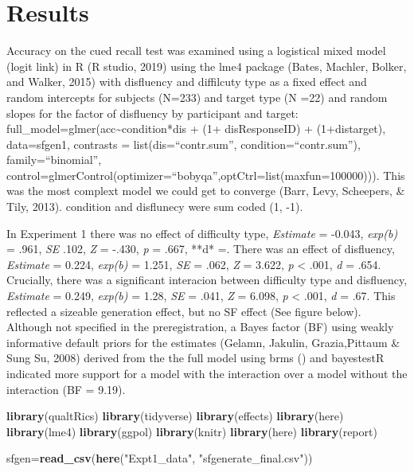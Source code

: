 \documentclass[pdf]{apa6}
\newenvironment{Shaded}{\begin{snugshade}}{\end{snugshade}}
\newcommand{\KeywordTok}[1]{\textcolor[rgb]{0.13,0.29,0.53}{\textbf{#1}}}
\newcommand{\NormalTok}[1]{#1}
\newcommand{\StringTok}[1]{\textcolor[rgb]{0.31,0.60,0.02}{#1}}
\begin{document}
\hypertarget{results-1}{%
\section{Results}\label{results-1}}

Accuracy on the cued recall test was examined using a logistical mixed model (logit link) in R (R studio, 2019) using the lme4 package (Bates, Machler, Bolker, and Walker, 2015) with disfluency and diffilcuty type as a fixed effect and random intercepts for subjects (N=233) and target type (N =22) and random slopes for the factor of disfluency by participant and target: full\_model=glmer(acc\textasciitilde{}condition*dis + (1+ dis\textbar{}ResponseID) + (1+dis\textbar{}target), data=sfgen1, contrasts = list(dis=\enquote{contr.sum}, condition=\enquote{contr.sum}), family=\enquote{binomial}, control=glmerControl(optimizer=\enquote{bobyqa},optCtrl=list(maxfun=100000))). This was the most complext model we could get to converge (Barr, Levy, Scheepers, \& Tily, 2013). condition and disflunecy were sum coded (1, -1).

In Experiment 1 there was no effect of difficulty type, \emph{Estimate} = -0.043, \emph{exp(b)} = .961, \emph{SE} .102, \emph{Z} = -.430, \emph{p} = .667, **d* =. There was an effect of disfluency, \emph{Estimate} = 0.224, \emph{exp(b)} = 1.251, \emph{SE} = .062, \emph{Z} = 3.622, \emph{p} \textless{} .001, \emph{d} = .654. Crucially, there was a significant interacion between difficulty type and disfluency, \emph{Estimate} = 0.249, \emph{exp(b)} = 1.28, \emph{SE} = .041, \emph{Z} = 6.098, \emph{p} \textless{} .001, \emph{d} = .67. This reflected a sizeable generation effect, but no SF effect (See figure below). Although not specified in the preregistration, a Bayes factor (BF) using weakly informative default priors for the estimates (Gelamn, Jakulin, Grazia,Pittaum \& Sung Su, 2008) derived from the the full model using brms () and bayestestR indicated more support for a model with the interaction over a model without the interaction (BF = 9.19).

\begin{Shaded}
\begin{Highlighting}[]
\KeywordTok{library}\NormalTok{(qualtRics)}
\KeywordTok{library}\NormalTok{(tidyverse)}
\KeywordTok{library}\NormalTok{(effects)}
\KeywordTok{library}\NormalTok{(here)}
\KeywordTok{library}\NormalTok{(lme4)}
\KeywordTok{library}\NormalTok{(ggpol)}
\KeywordTok{library}\NormalTok{(knitr)}
\KeywordTok{library}\NormalTok{(here)}
\KeywordTok{library}\NormalTok{(report)}

\NormalTok{sfgen=}\KeywordTok{read_csv}\NormalTok{(}\KeywordTok{here}\NormalTok{(}\StringTok{"Expt1_data"}\NormalTok{, }\StringTok{"sfgenerate_final.csv"}\NormalTok{))}
\end{Highlighting}
\end{Shaded}
\end{document}
